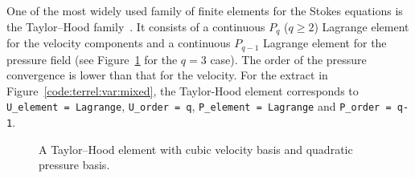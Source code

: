 One of the most widely used family of finite elements for the Stokes
equations is the Taylor--Hood family~\citep{TaylorHood1973,Boffi1997}.
It consists of a continuous $P_q$ ($q\geqslant 2$) Lagrange element for
the velocity components and a continuous $P_{q-1}$ Lagrange element for
the pressure field (see Figure~\ref{fig:terrel:THElements} for the $q=3$
case). The order of the pressure convergence is lower than that for the
velocity.  For the \ufl{} extract in Figure~\ref{code:terrel:var:mixed},
the Taylor-Hood element corresponds to {\tt U\_element = Lagrange},
{\tt U\_order = q}, {\tt P\_element = Lagrange} and {\tt P\_order = q-1}.
%
\begin{figure}
  \center
  \hspace{2em}
  \caption{A Taylor--Hood element with 
  cubic velocity basis and  quadratic
  pressure basis.}
\label{fig:terrel:THElements}
\end{figure}

